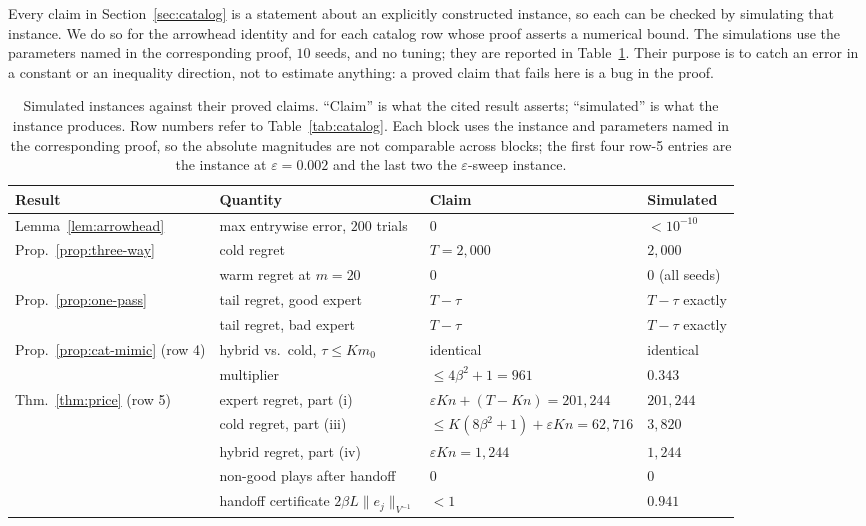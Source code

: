 \documentclass{article}
\theoremstyle{definition}
\theoremstyle{remark}
\newcommand{\eps}{\varepsilon}
\theoremstyle{remark}
\begin{document}
Every claim in Section~\ref{sec:catalog} is a statement about an explicitly
constructed instance, so each can be checked by simulating that instance. We
do so for the arrowhead identity and for each catalog row whose proof asserts
a numerical bound. The simulations use the parameters named in the
corresponding proof, $10$ seeds, and no tuning; they are reported in
Table~\ref{tab:synthetic}. Their purpose is to catch an error in a constant or
an inequality direction, not to estimate anything: a proved claim that fails
here is a bug in the proof.

\begin{table}[h]
\centering
\caption{Simulated instances against their proved claims. ``Claim'' is what
the cited result asserts; ``simulated'' is what the instance produces. Row
numbers refer to Table~\ref{tab:catalog}. Each block uses the instance and
parameters named in the corresponding proof, so the absolute magnitudes are
not comparable across blocks; the first four row-5 entries are the instance at
$\eps=0.002$ and the last two the $\eps$-sweep instance.}
\label{tab:synthetic}
\small
\setlength{\tabcolsep}{4pt}
\begin{tabular}{@{}llll@{}}
\toprule
Result & Quantity & Claim & Simulated \\
\midrule
Lemma~\ref{lem:arrowhead} & max entrywise error, $200$ trials & $0$ & $<10^{-10}$ \\
\midrule
Prop.~\ref{prop:three-way} & cold regret & $T=2{,}000$ & $2{,}000$ \\
 & warm regret at $m=20$ & $0$ & $0$ (all seeds) \\
Prop.~\ref{prop:one-pass} & tail regret, good expert & $T-\tau$ & $T-\tau$ exactly \\
 & tail regret, bad expert & $T-\tau$ & $T-\tau$ exactly \\
\midrule
Prop.~\ref{prop:cat-mimic} (row 4) & hybrid vs.\ cold, $\tau\le Km_0$ & identical & identical \\
 & multiplier & $\le4\beta^2+1=961$ & $0.343$ \\
\midrule
Thm.~\ref{thm:price} (row 5) & expert regret, part (i) & $\eps Kn+(T{-}Kn)=201{,}244$ & $201{,}244$ \\
 & cold regret, part (iii) & $\le K(8\beta^2{+}1)+\eps Kn=62{,}716$ & $3{,}820$ \\
 & hybrid regret, part (iv) & $\eps Kn=1{,}244$ & $1{,}244$ \\
 & non-good plays after handoff & $0$ & $0$ \\
 & handoff certificate $2\beta L\|e_j\|_{V^{-1}}$ & $<1$ & $0.941$ \\

\end{tabular}
\end{table}
\end{document}
